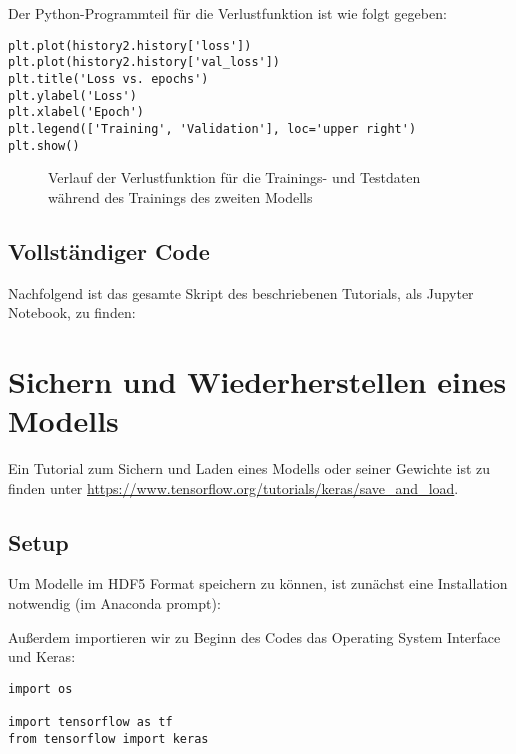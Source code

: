 Der Python-Programmteil für die Verlustfunktion ist wie folgt gegeben:

\begin{verbatim}
plt.plot(history2.history['loss'])
plt.plot(history2.history['val_loss'])
plt.title('Loss vs. epochs')
plt.ylabel('Loss')
plt.xlabel('Epoch')
plt.legend(['Training', 'Validation'], loc='upper right')
plt.show()
\end{verbatim}

\begin{figure}[H]
	\caption{Verlauf der Verlustfunktion für die Trainings- und Testdaten während des Trainings des zweiten Modells}
	\label{TensorFlowIrisPlotHist4}
\end{figure}

\subsection{Vollständiger Code}
Nachfolgend ist das gesamte Skript des beschriebenen Tutorials, als Jupyter Notebook, zu finden:






\section{Sichern und Wiederherstellen eines Modells}
Ein Tutorial zum Sichern und Laden eines Modells oder seiner Gewichte ist zu finden unter \url{https://www.tensorflow.org/tutorials/keras/save_and_load}.

\subsection{Setup}
Um Modelle im HDF5 Format speichern zu können, ist zunächst eine Installation notwendig (im Anaconda prompt):

\medskip


\medskip

Außerdem importieren wir zu Beginn des Codes das Operating System Interface und Keras:

\begin{verbatim}
import os

import tensorflow as tf
from tensorflow import keras
\end{verbatim}

